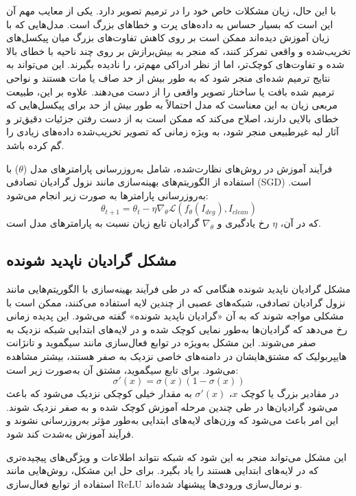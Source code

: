  با این حال، زیان  مشکلات خاص خود را در ترمیم تصویر دارد. یکی از معایب مهم آن این است که بسیار حساس به داده‌های پرت و خطاهای بزرگ است. مدل‌هایی که با زیان  آموزش دیده‌اند ممکن است بر روی کاهش تفاوت‌های بزرگ میان پیکسل‌های تخریب‌شده و واقعی تمرکز کنند، که منجر به بیش‌برازش
بر روی چند ناحیه با خطای بالا شده و تفاوت‌های کوچک‌تر، اما از نظر ادراکی مهم‌تر، را نادیده بگیرند. این می‌تواند به نتایج ترمیم شده‌ای منجر شود که به طور بیش از حد صاف یا مات هستند و نواحی ترمیم شده بافت یا ساختار تصویر واقعی را از دست می‌دهند. علاوه بر این، طبیعت مربعی زیان  به این معناست که مدل احتمالاً به طور بیش از حد برای پیکسل‌هایی که خطای بالایی دارند، اصلاح می‌کند که ممکن است به از دست رفتن جزئیات دقیق‌تر و آثار لبه غیرطبیعی منجر شود، به ویژه زمانی که تصویر تخریب‌شده داده‌های زیادی را گم کرده باشد.
 

فرآیند آموزش در روش‌های نظارت‌شده، شامل به‌روزرسانی پارامترهای مدل (\(\theta\)) با استفاده از الگوریتم‌های بهینه‌سازی مانند نزول گرادیان تصادفی (SGD) است. به‌روزرسانی پارامترها به صورت زیر انجام می‌شود:  
$$
\theta_{t+1} = \theta_t - \eta \nabla_{\theta} \mathcal{L}(f_{\theta}(I_{deg}), I_{clean})
$$
که در آن، $\eta$ رخ یادگیری و 
$ \nabla_{\theta} $
گرادیان تابع زیان نسبت به پارامترهای مدل است.  

\subsection{مشکل گرادیان ناپدید شونده}
مشکل گرادیان ناپدید شونده%
هنگامی که در طی فرآیند بهینه‌سازی با الگوریتم‌هایی مانند نزول گرادیان تصادفی، شبکه‌های عصبی از چندین لایه استفاده می‌کنند، ممکن است با مشکلی مواجه شوند که به آن «گرادیان ناپدید شونده» گفته می‌شود. این پدیده زمانی رخ می‌دهد که گرادیان‌ها به‌طور نمایی کوچک شده و در لایه‌های ابتدایی شبکه نزدیک به صفر می‌شوند. این مشکل به‌ویژه در توابع فعال‌سازی مانند سیگموید و تانژانت هایپربولیک که مشتق‌هایشان در دامنه‌های خاصی نزدیک به صفر هستند، بیشتر مشاهده می‌شود. برای تابع سیگموید، مشتق آن به‌صورت زیر است:
$$
\sigma'(x) = \sigma(x)(1 - \sigma(x))
$$
در مقادیر بزرگ یا کوچک $x$، $\sigma'(x)$ به مقدار خیلی کوچکی نزدیک می‌شود که باعث می‌شود گرادیان‌ها در طی چندین مرحله آموزش کوچک شده و به صفر نزدیک شوند. این امر باعث می‌شود که وزن‌های لایه‌های ابتدایی به‌طور مؤثر به‌روزرسانی نشوند و فرآیند آموزش به‌شدت کند شود.

این مشکل می‌تواند منجر به این شود که شبکه نتواند اطلاعات و ویژگی‌های پیچیده‌تری که در لایه‌های ابتدایی هستند را یاد بگیرد. برای حل این مشکل، روش‌هایی مانند استفاده از توابع فعال‌سازی ReLU و نرمال‌سازی ورودی‌ها پیشنهاد شده‌اند.

